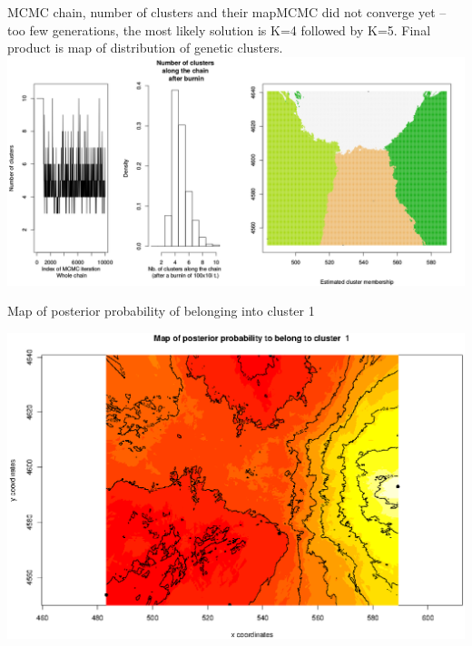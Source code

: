 \documentclass[compress, ucs, xelatex, 11pt, xcolor=svgnames,
  hyperref={
    bookmarks=true,
    unicode=true,
    colorlinks=true,
    pdftitle={Molecular data in R},
    plainpages=false,
    pdfauthor={Vojtech Zeisek},
    pdfsubject={Course about phylogeny and evolution in R},
    pdfcreator={XeLaTeX},
    pdfkeywords={R, evolution, phylogeny, molecular data},
    linkcolor=Tomato,
    anchorcolor=SaddleBrown,
    citecolor=Goldenrod,
    filecolor=DarkMagenta,
    menucolor=Sienna,
    urlcolor=DarkTurquoise,
    pdftex},
  url={hyphens, lowtilde} %
  ]{beamer}
\begin{document}
\begin{frame}{MCMC chain, number of clusters and their map}{MCMC did not converge yet -- too few generations, the most likely solution is K=4 followed by K=5. Final product is map of distribution of genetic clusters.}
  \includegraphics[width=\textwidth]{geneland1.png}
\end{frame}

\begin{frame}{Map of posterior probability of belonging into cluster 1}
  \begin{center}
    \includegraphics[width=\textwidth-1.5cm]{geneland2.png}
  \end{center}
\end{frame}
\end{document}
